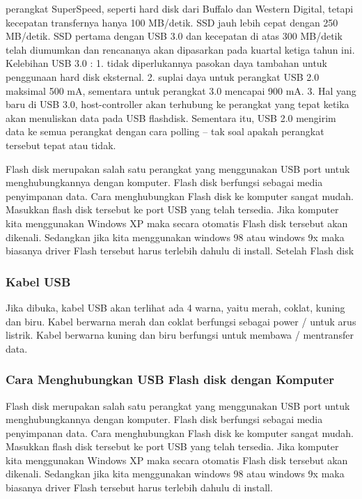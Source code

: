 perangkat Super­Speed, seperti hard disk dari Buffalo dan Western Digital, tetapi kecepatan transfernya hanya 100 MB/detik. SSD jauh lebih cepat dengan 250 MB/detik. SSD pertama dengan USB 3.0 dan kecepatan di atas 300 MB/detik telah diumumkan dan rencananya akan dipasarkan pada kuartal ketiga tahun ini.
 Kelebihan USB 3.0 :
 1. tidak diperlukannya pasokan daya tambahan untuk penggunaan hard disk eksternal.
 2. suplai daya untuk perangkat USB 2.0 maksimal 500 mA, sementara untuk perangkat 3.0 mencapai 900 mA.
 3. Hal yang baru di USB 3.0, host-controller akan terhubung ke perangkat yang tepat ketika akan menuliskan data pada USB flashdisk. Sementara itu, USB 2.0 mengirim data ke semua perangkat de­ngan cara polling – tak soal apakah perangkat tersebut tepat atau tidak.

Flash disk merupakan salah satu perangkat yang menggunakan USB port untuk menghubungkannya dengan komputer. Flash disk berfungsi sebagai media penyimpanan data. Cara menghubungkan Flash disk ke komputer sangat mudah. Masukkan flash disk tersebut ke port USB yang telah tersedia. Jika komputer kita menggunakan Windows XP maka secara otomatis Flash disk tersebut akan dikenali. Sedangkan jika kita menggunakan windows 98 atau windows 9x maka biasanya driver Flash tersebut harus terlebih dahulu di install. Setelah Flash disk

\subsubsection{Kabel USB}
Jika dibuka, kabel USB akan terlihat ada 4 warna, yaitu merah, coklat, kuning dan biru. Kabel berwarna merah dan coklat berfungsi sebagai power / untuk arus listrik. Kabel berwarna kuning dan biru berfungsi untuk membawa / mentransfer data.
\subsubsection{Cara Menghubungkan USB Flash disk dengan Komputer }
Flash disk merupakan salah satu perangkat yang menggunakan USB port untuk menghubungkannya dengan komputer. Flash disk berfungsi sebagai media penyimpanan data. Cara menghubungkan Flash disk ke komputer sangat mudah. Masukkan flash disk tersebut ke port USB yang telah tersedia. Jika komputer kita menggunakan Windows XP maka secara otomatis Flash disk tersebut akan dikenali. Sedangkan jika kita menggunakan windows 98 atau windows 9x maka biasanya driver Flash tersebut harus terlebih dahulu di install. 




